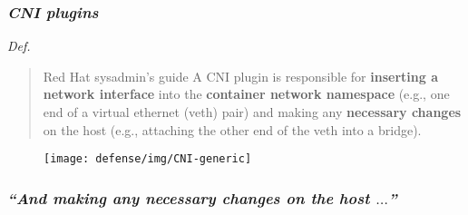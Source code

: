 \begin{frame}
  \frametitle{ \textit{CNI plugins}}
  \vspace{.5em}
  \begin{block}{ \emph{Def.}}
    \begin{quote}{Red Hat sysadmin's guide}
      \vspace{.5em}
      \small
      A CNI plugin is responsible for \alert{\textbf{inserting a network interface}} into the
      \alert{\textbf{container network namespace}} (e.g., one end of a virtual ethernet (veth)
      pair) and making any \alert{\textbf{necessary changes}} on the host (e.g., attaching the
      other end of the veth into a bridge).
    \end{quote}
  \end{block}
  \pause
  \begin{figure}
    \centering
    \texttt{[image: defense/img/CNI-generic]}
  \end{figure}
\end{frame}

\begin{frame}
  \frametitle{  \textit{``And making any necessary changes on the host $\dots$''}}
\end{frame}
